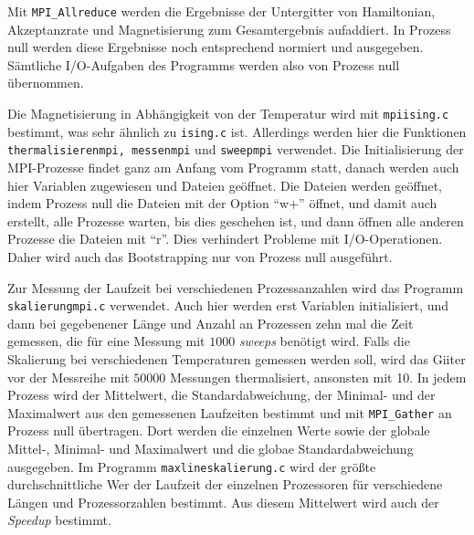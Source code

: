 	Mit \texttt{MPI\_Allreduce} werden die Ergebnisse der Untergitter von Hamiltonian, Akzeptanzrate und Magnetisierung zum Gesamtergebnis aufaddiert. In Prozess null werden diese Ergebnisse noch entsprechend normiert und ausgegeben. Sämtliche I/O-Aufgaben des Programms werden also von Prozess null übernommen.
	
	Die Magnetisierung in Abhängigkeit von der Temperatur wird mit \texttt{mpiising.c} bestimmt, was sehr ähnlich zu \texttt{ising.c} ist. Allerdings werden hier die Funktionen \texttt{thermalisierenmpi, messenmpi} und \texttt{sweepmpi} verwendet. 
	Die Initialisierung der MPI-Prozesse findet ganz am Anfang vom Programm statt, danach werden auch hier Variablen zugewiesen und Dateien geöffnet. Die Dateien werden geöffnet, indem Prozess null die Dateien mit der Option \enquote{w+} öffnet, und damit auch erstellt, alle Prozesse warten, bis dies geschehen ist, und dann öffnen alle anderen Prozesse die Dateien mit \enquote{r}. Dies verhindert Probleme mit I/O-Operationen. Daher wird auch das Bootstrapping nur von Prozess null ausgeführt.
	
	Zur Messung der Laufzeit bei verschiedenen Prozessanzahlen wird das Programm \texttt{skalierungmpi.c} verwendet. Auch hier werden erst Variablen initialisiert, und dann bei gegebenener Länge und Anzahl an Prozessen zehn mal die Zeit gemessen, die für eine Messung mit $1000$ \textit{sweeps} benötigt wird. Falls die Skalierung bei verschiedenen Temperaturen gemessen werden soll, wird das Giiter vor der Messreihe mit $50000$ Messungen thermalisiert, ansonsten mit 10. In jedem Prozess wird der Mittelwert, die Standardabweichung, der Minimal- und der Maximalwert aus den gemessenen Laufzeiten bestimmt und mit \texttt{MPI\_Gather} an Prozess null übertragen. Dort werden die einzelnen Werte sowie der globale Mittel-, Minimal- und Maximalwert und die globae Standardabweichung ausgegeben. Im Programm \texttt{maxlineskalierung.c} wird der größte durchschnittliche Wer der Laufzeit der einzelnen Prozessoren für verschiedene Längen und Prozessorzahlen bestimmt. Aus diesem Mittelwert wird auch der \textit{Speedup} bestimmt.  
%	


	
